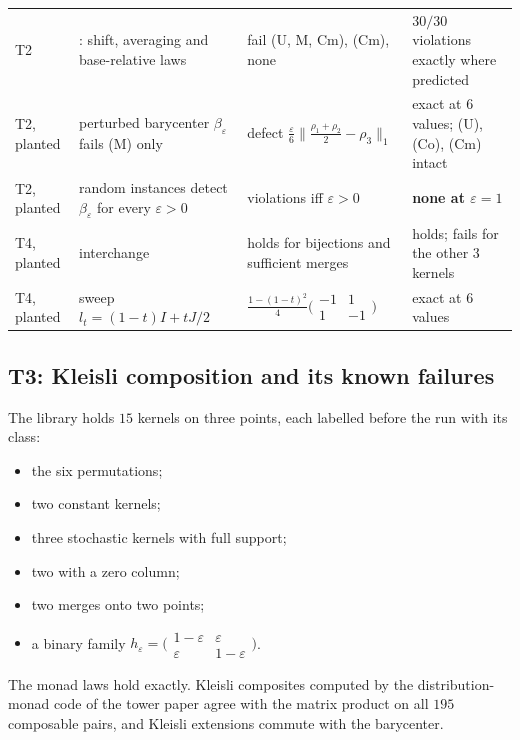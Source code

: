 \documentclass[11pt]{article}
\theoremstyle{definition}
\theoremstyle{remark}
\begin{document}
\begin{table}[!htbp]
\begin{tabular}{>{\raggedright}p{1.25cm}>{\raggedright}p{4.5cm}>{\raggedright}p{4.1cm}>{\raggedright\arraybackslash}p{4.2cm}}
T2 & \cite[Table~2]{Tower}: shift, averaging and base-relative laws & fail (U, M, Cm), (Cm), none & $30/30$ violations exactly where predicted\\
T2, planted & perturbed barycenter $\beta_\varepsilon$ fails (M) only & defect $\frac\varepsilon6\lVert\frac{\rho_1+\rho_2}2-\rho_3\rVert_1$ & exact at $6$ values; (U), (Co), (Cm) intact\\
T2, planted & random instances detect $\beta_\varepsilon$ for every $\varepsilon>0$ & violations iff $\varepsilon>0$ & \textbf{none at $\varepsilon=1$}\\
T4, planted & interchange \cite[Prop.~6.1]{Algebras} & holds for bijections and sufficient merges & holds; fails for the other $3$ kernels\\
T4, planted & sweep $l_t=(1-t)I+tJ/2$ & $\frac{1-(1-t)^2}4\bigl(\begin{smallmatrix}-1&1\\1&-1\end{smallmatrix}\bigr)$ & exact at $6$ values\\
\bottomrule
\end{tabular}
\end{table}

\subsection{T3: Kleisli composition and its known failures}

The library holds $15$ kernels on three points, each labelled before the run with its class:
\begin{itemize}[leftmargin=*,nosep]
\item the six permutations;
\item two constant kernels;
\item three stochastic kernels with full support;
\item two with a zero column;
\item two merges onto two points;
\item a binary family $h_\varepsilon=\bigl(\begin{smallmatrix}1-\varepsilon&\varepsilon\\\varepsilon&1-\varepsilon\end{smallmatrix}\bigr)$.
\end{itemize}
The monad laws hold exactly. Kleisli composites computed by the distribution-monad code of the tower paper agree with the matrix product
on all $195$ composable pairs, and Kleisli extensions commute with the barycenter.
\end{document}
